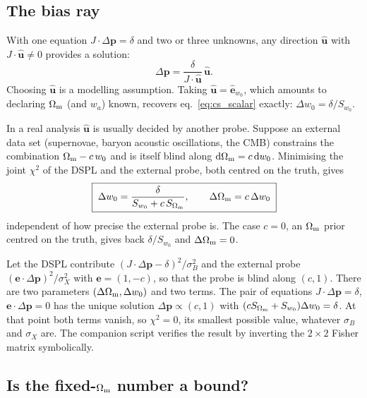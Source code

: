 \subsection{The bias ray}

With one equation $J\cdot\Delta\bm{p}=\delta$ and two or three unknowns,
any direction $\hat{\bm{u}}$ with $J\cdot\hat{\bm{u}}\neq0$ provides a
solution:
\begin{equation}
  \Delta\bm{p}=\frac{\delta}{J\cdot\hat{\bm{u}}}\,\hat{\bm{u}} .
  \label{eq:cs_ray}
\end{equation}
Choosing $\hat{\bm{u}}$ is a modelling assumption. Taking
$\hat{\bm{u}}=\hat{\bm{e}}_{w_0}$, which amounts to declaring $\Omega_{\mathrm{m}}$
(and $w_a$) known, recovers eq.~\eqref{eq:cs_scalar} exactly:
$\Delta w_0=\delta/S_{w_0}$.

In a real analysis $\hat{\bm{u}}$ is usually decided by another probe.
Suppose an external data set (supernovae, baryon acoustic oscillations,
the CMB) constrains the combination $\Omega_{\mathrm{m}}-c\,w_0$ and is itself blind
along $\dd\Omega_{\mathrm{m}}=c\,\dd w_0$. Minimising the joint $\chi^2$ of the DSPL
and the external probe, both centred on the truth, gives
\begin{equation}
  \boxed{\;\Delta w_0=\frac{\delta}{S_{w_0}+c\,S_{\Omega_{\mathrm{m}}}},\qquad
  \Delta\Omega_{\mathrm{m}}=c\,\Delta w_0\;}
  \label{eq:cs_marginalised}
\end{equation}
independent of how precise the external probe is. The case $c=0$,
an $\Omega_{\mathrm{m}}$ prior centred on the truth, gives back $\delta/S_{w_0}$
and $\Delta\Omega_{\mathrm{m}}=0$.

\begin{derivation}
Let the DSPL contribute $(J\cdot\Delta\bm{p}-\delta)^2/\sigma_B^2$ and the
external probe $(\bm{e}\cdot\Delta\bm{p})^2/\sigma_X^2$ with
$\bm{e}=(1,-c)$, so that the probe is blind along $(c,1)$. There are two
parameters $(\Delta\Omega_{\mathrm{m}},\Delta w_0)$ and two terms. The pair of
equations $J\cdot\Delta\bm{p}=\delta$, $\bm{e}\cdot\Delta\bm{p}=0$ has
the unique solution $\Delta\bm{p}\propto(c,1)$ with
$(cS_{\Omega_{\mathrm{m}}}+S_{w_0})\Delta w_0=\delta$. At that point both terms
vanish, so $\chi^2=0$, its smallest possible value, whatever $\sigma_B$
and $\sigma_X$ are. The companion script verifies the result by
inverting the $2\times2$ Fisher matrix symbolically.
\end{derivation}

\subsection{Is the fixed-$\Omega_{\mathrm{m}}$ number a bound?}

